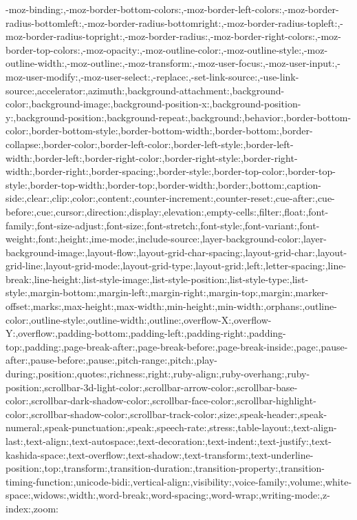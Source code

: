 {{		-moz-binding:,-moz-border-bottom-colors:,-moz-border-left-colors:,-moz-border-radius-bottomleft:,-moz-border-radius-bottomright:,-moz-border-radius-topleft:,-moz-border-radius-topright:,-moz-border-radius:,-moz-border-right-colors:,-moz-border-top-colors:,-moz-opacity:,-moz-outline-color:,-moz-outline-style:,-moz-outline-width:,-moz-outline:,-moz-transform:,-moz-user-focus:,-moz-user-input:,-moz-user-modify:,-moz-user-select:,-replace:,-set-link-source:,-use-link-source:,accelerator:,azimuth:,background-attachment:,background-color:,background-image:,background-position-x:,background-position-y:,background-position:,background-repeat:,background:,behavior:,border-bottom-color:,border-bottom-style:,border-bottom-width:,border-bottom:,border-collapse:,border-color:,border-left-color:,border-left-style:,border-left-width:,border-left:,border-right-color:,border-right-style:,border-right-width:,border-right:,border-spacing:,border-style:,border-top-color:,border-top-style:,border-top-width:,border-top:,border-width:,border:,bottom:,caption-side:,clear:,clip:,color:,content:,counter-increment:,counter-reset:,cue-after:,cue-before:,cue:,cursor:,direction:,display:,elevation:,empty-cells:,filter:,float:,font-family:,font-size-adjust:,font-size:,font-stretch:,font-style:,font-variant:,font-weight:,font:,height:,ime-mode:,include-source:,layer-background-color:,layer-background-image:,layout-flow:,layout-grid-char-spacing:,layout-grid-char:,layout-grid-line:,layout-grid-mode:,layout-grid-type:,layout-grid:,left:,letter-spacing:,line-break:,line-height:,list-style-image:,list-style-position:,list-style-type:,list-style:,margin-bottom:,margin-left:,margin-right:,margin-top:,margin:,marker-offset:,marks:,max-height:,max-width:,min-height:,min-width:,orphans:,outline-color:,outline-style:,outline-width:,outline:,overflow-X:,overflow-Y:,overflow:,padding-bottom:,padding-left:,padding-right:,padding-top:,padding:,page-break-after:,page-break-before:,page-break-inside:,page:,pause-after:,pause-before:,pause:,pitch-range:,pitch:,play-during:,position:,quotes:,richness:,right:,ruby-align:,ruby-overhang:,ruby-position:,scrollbar-3d-light-color:,scrollbar-arrow-color:,scrollbar-base-color:,scrollbar-dark-shadow-color:,scrollbar-face-color:,scrollbar-highlight-color:,scrollbar-shadow-color:,scrollbar-track-color:,size:,speak-header:,speak-numeral:,speak-punctuation:,speak:,speech-rate:,stress:,table-layout:,text-align-last:,text-align:,text-autospace:,text-decoration:,text-indent:,text-justify:,text-kashida-space:,text-overflow:,text-shadow:,text-transform:,text-underline-position:,top:,transform:,transition-duration:,transition-property:,transition-timing-function:,unicode-bidi:,vertical-align:,visibility:,voice-family:,volume:,white-space:,widows:,width:,word-break:,word-spacing:,word-wrap:,writing-mode:,z-index:,zoom:
}}
